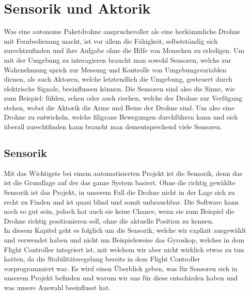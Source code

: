 \chapter{Sensorik und Aktorik}
\label{sensor}
Was eine autonome Paketdrohne anspruchsvoller als eine herkömmliche Drohne mit Fernbedienung macht, ist vor allem die Fähigkeit, selbstständig sich zurechtzufinden und ihre Aufgabe ohne die Hilfe von Menschen zu erledigen. Um mit der Umgebung zu interagieren braucht man sowohl Sensoren, welche zur Wahrnehmung sprich zur Messung und Kontrolle von Umgebungsvariablen dienen, als auch Aktoren, welche letztendlich die Umgebung, gesteuert durch elektrische Signale, beeinflussen können. Die Sensoren sind also die Sinne, wie zum Beispiel: fühlen, sehen oder auch riechen, welche der Drohne zur Verfügung stehen, wobei die Aktorik die Arme und Beine der Drohne sind. Um also eine Drohne zu entwickeln, welche filigrane Bewegungen durchführen kann und sich überall zurechtfinden kann braucht man dementsprechend viele Sensoren. 


\section{Sensorik}
Mit das Wichtigste bei einem automatisierten Projekt ist die Sensorik, denn das ist die Grundlage auf der das ganze System basiert. Ohne die richtig gewählte Sensorik ist das Projekt, in unserem Fall die Drohne nicht in der Lage sich zu recht zu Finden und ist quasi blind und somit unbrauchbar. Die Software kann noch so gut sein, jedoch hat auch sie keine Chance, wenn sie zum Beispiel die Drohne richtig positionieren soll, ohne die aktuelle Position zu kennen.\\

In diesem Kapitel geht es folglich um die Sensorik, welche wir explizit ausgewählt und verwendet haben und nicht um Beispielsweise das Gyroskop, welches in dem Flight Controller integriert ist, mit welchem wir aber nicht wirklich etwas zu tun hatten, da die Stabilitätsregelung bereits in dem Flight Controller vorprogrammiert war. Es wird einen Überblick geben, was für Sensoren sich in unserem Projekt befinden und warum wir uns für diese entschieden haben und was unsere Auswahl beeinflusst hat.

